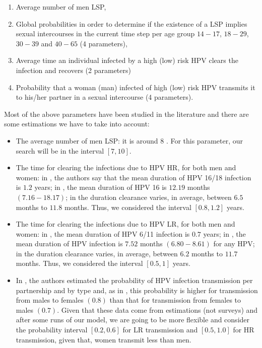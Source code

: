 \begin{enumerate}
	\item Average number of men LSP, 
	\item Global probabilities in order to determine if the existence of a LSP implies sexual intercourses in the current time step per age group $14-17$, $18-29$, $30-39$ and $40-65$ (4 parameters),
	\item Average time an individual infected by a high (low) risk HPV clears the infection and recovers (2 parameters)
	\item Probability that a woman (man) infected of high (low) risk HPV transmits it to his/her partner in a sexual intercourse (4 parameters). 
\end{enumerate}

Most of the above parameters have been studied in the literature and there are some estimations we have to take into account:
\begin{itemize}
	\item The average number of men LSP: it is around $8$ \cite{Durex2002}. For this parameter, our search will be in the interval $[7, 10]$.

	\item The time for clearing the infections due to HPV HR, for both men and women: in \cite{elbasha2007model}, the authors say that the mean duration of HPV 16/18 infection is $1.2$ years; in \cite{Giuliano2011}, the mean duration of HPV 16 is $12.19$  months $(7.16-18.17)$; in \cite{Nyitray2015} the duration clearance varies, in average, between $6.5$ months to $11.8$ months. Thus, we considered the interval $[0.8, 1.2]$ years.
	
	\item The time for clearing the infections due to HPV LR, for both men and women: in \cite{elbasha2007model}, the mean duration of HPV 6/11 infection is $0.7$ years; in \cite{Giuliano2011}, the mean duration of HPV infection is $7.52$ months $(6.80-8.61)$ for any HPV;  in \cite{Nyitray2015} the duration clearance varies, in average, between $6.2$ months to $11.7$ months. Thus, we considered the interval $[0.5, 1]$ years.
	
	\item In \cite{elbasha2007model}, the authors estimated the probability of HPV infection transmission per partnership and by type and, as in \cite{castellsague2012prevalence}, this probability is higher for transmission from males to females $(0.8)$ than that for transmission from females to males $(0.7)$. Given that these data come from estimations (not surveys) and after some runs of our model, we are going to be more flexible and consider the probability interval $[0.2,0.6]$ for LR transmission and $[0.5,1.0]$ for HR transmission, given that, women transmit less than men.
\end{itemize}


